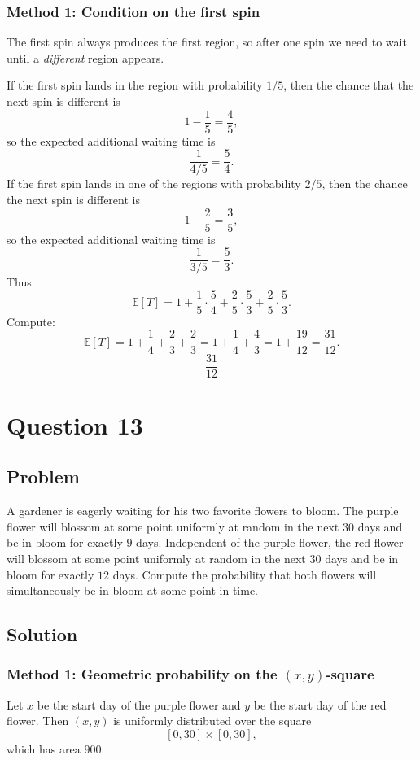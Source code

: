 \documentclass[12pt]{article}
\begin{document}
\subsubsection{Method 1: Condition on the first spin}
The first spin always produces the first region, so after one spin we need to wait until a \emph{different} region appears.

If the first spin lands in the region with probability $1/5$, then the chance that the next spin is different is
\[
1-\frac15 = \frac45,
\]
so the expected additional waiting time is
\[
\frac{1}{4/5}=\frac54.
\]
If the first spin lands in one of the regions with probability $2/5$, then the chance the next spin is different is
\[
1-\frac25 = \frac35,
\]
so the expected additional waiting time is
\[
\frac{1}{3/5}=\frac53.
\]
Thus
\[
\mathbb{E}[T] = 1 + \frac15\cdot\frac54 + \frac25\cdot\frac53 + \frac25\cdot\frac53.
\]
Compute:
\[
\mathbb{E}[T] = 1 + \frac14 + \frac23 + \frac23 = 1 + \frac14 + \frac43 = 1 + \frac{19}{12} = \frac{31}{12}.
\]
\[
\boxed{\frac{31}{12}}
\]

\newpage
\section{Question 13}
\subsection{Problem}
A gardener is eagerly waiting for his two favorite flowers to bloom. The purple flower will blossom at some point uniformly at random in the next $30$ days and be in bloom for exactly $9$ days. Independent of the purple flower, the red flower will blossom at some point uniformly at random in the next $30$ days and be in bloom for exactly $12$ days. Compute the probability that both flowers will simultaneously be in bloom at some point in time.

\subsection{Solution}
\subsubsection{Method 1: Geometric probability on the $(x,y)$-square}
Let $x$ be the start day of the purple flower and $y$ be the start day of the red flower. Then $(x,y)$ is uniformly distributed over the square
\[
[0,30]\times [0,30],
\]
which has area $900$.
\end{document}
